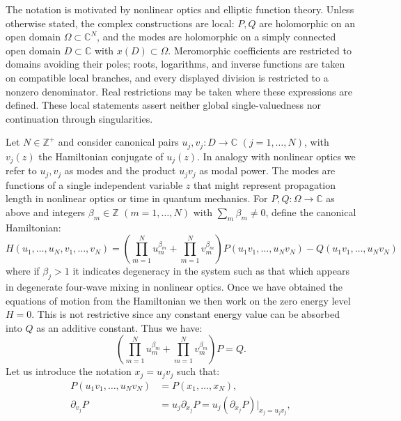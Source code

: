 \documentclass[11pt,a4paper]{article}
\numberwithin{equation}{section}
\begin{document}
The notation is motivated by nonlinear optics and elliptic function theory.
Unless otherwise stated, the complex constructions are local: $P,Q$ are holomorphic on an open domain $\Omega\subset\mathbb C^N$, and the modes are holomorphic on a simply connected open domain $D\subset\mathbb C$ with $x(D)\subset\Omega$.
Meromorphic coefficients are restricted to domains avoiding their poles; roots, logarithms, and inverse functions are taken on compatible local branches, and every displayed division is restricted to a nonzero denominator.
Real restrictions may be taken where these expressions are defined. These local statements assert neither global single-valuedness nor continuation through singularities.

Let $N\in\mathbb Z^+$ and consider canonical pairs $u_j,v_j:D\to\mathbb C$ $(j=1,\ldots,N)$, with $v_j(z)$ the Hamiltonian conjugate of $u_j(z)$.
In analogy with nonlinear optics we refer to $u_j, v_j$ as modes and the product $u_j v_j$ as modal power. 
The modes are functions of a single independent variable $z$ that might represent propagation length in nonlinear optics or time in quantum mechanics. 
For $P,Q:\Omega\to\mathbb C$ as above and integers $\beta_m\in\mathbb Z$ $(m=1,\ldots,N)$ with $\sum_m\beta_m\ne0$, define the canonical Hamiltonian:
\begin{equation}
    H\left(u_1,\dots, u_N, v_1,\dots, v_N\right) = \left(\prod_{m=1}^{N} u_{m}^{{\beta}_{m}} + \prod_{m=1}^{N} v_{m}^{{\beta}_{m}}\right) P{\left(u_1 v_1, \dots , u_N v_N \right)} - Q{\left(u_1 v_1, \dots , u_N v_N\right)} \label{eq:Hamiltonian}
\end{equation}
where if $\beta_j>1$ it indicates degeneracy in the system such as that which appears in degenerate four-wave mixing in nonlinear optics.
Once we have obtained the equations of motion from the Hamiltonian we then work on the zero energy level $H=0$. 
This is not restrictive since any constant energy value can be absorbed into $Q$ as an additive constant. 
Thus we have:
\begin{equation}
 \left(\prod_{m=1}^{N} u_{m}^{{\beta}_{m}} + \prod_{m=1}^{N} v_{m}^{{\beta}_{m}}\right) P = Q. \label{eq:u-v-prod-P-Q-pos}
\end{equation} 
Let us introduce the notation $x_j = u_j v_j$ such that:
\begin{align}
    P{\left(u_1 v_1, \dots , u_N v_N \right)} &= P{\left(x_1, \dots , x_N \right)}, \\
    \partial_{v_j} P &= u_j \partial_{x_j} P = u_j \left(\partial_{x_j} P\right) |_{x_j=u_j v_j},
\end{align}
\end{document}
